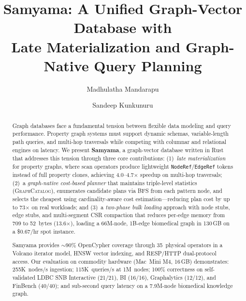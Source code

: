 \documentclass[sigconf, nonacm]{acmart}
\begin{document}
\title{Samyama: A Unified Graph-Vector Database with\\Late Materialization and Graph-Native Query Planning}

\author{Madhulatha Mandarapu}

\author{Sandeep Kunkunuru}

\begin{abstract}
Graph databases face a fundamental tension between flexible data modeling and query performance.
Property graph systems must support dynamic schemas, variable-length path queries, and multi-hop traversals while competing with columnar and relational engines on latency.
We present \textbf{Samyama}, a graph-vector database written in Rust that addresses this tension through three core contributions:
(1)~\emph{late materialization} for property graphs, where scan operators produce lightweight \texttt{NodeRef}/\texttt{EdgeRef} tokens instead of full property clones, achieving 4.0--4.7$\times$ speedup on multi-hop traversals;
(2)~a \emph{graph-native cost-based planner} that maintains triple-level statistics (\textsc{GraphCatalog}), enumerates candidate plans via BFS from each pattern node, and selects the cheapest using cardinality-aware cost estimation---reducing plan cost by up to 73$\times$ on real workloads; and
(3)~a \emph{two-phase bulk loading} approach with node stubs, edge stubs, and multi-segment CSR compaction that reduces per-edge memory from 709 to 52~bytes (13.6$\times$), loading a 66M-node, 1B-edge biomedical graph in 130\,GB on a \$0.67/hr spot instance.

Samyama provides ${\sim}$90\% OpenCypher coverage through 35~physical operators in a Volcano iterator model, HNSW vector indexing, and RESP/HTTP dual-protocol access.
Our evaluation on commodity hardware (Mac~Mini M4, 16\,GB) demonstrates:
255K~nodes/s ingestion; 115K~queries/s at 1M~nodes;
100\% correctness on self-validated LDBC SNB Interactive (21/21), BI (16/16), Graphalytics (12/12), and FinBench (40/40);
and sub-second query latency on a 7.9M-node biomedical knowledge graph.
\end{abstract}
\end{document}
